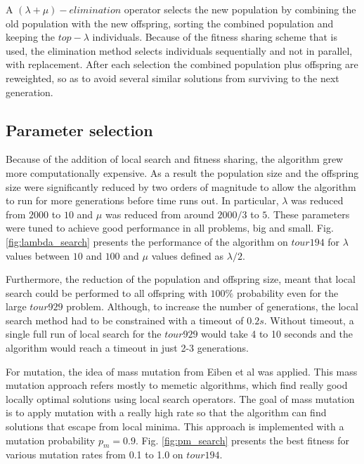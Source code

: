 \documentclass[a4paper,10pt]{article}
\newcommand{\ReplaceMe}[1]{{\color{blue}#1}}
\begin{document}
A $(\lambda+\mu)-elimination$ operator selects the new population by combining the old population with the new offspring, sorting the combined population and keeping the $top-\lambda$ individuals. Because of the fitness sharing scheme that is used, the elimination method selects individuals sequentially and not in parallel, with replacement. After each selection the combined population plus offspring are reweighted, so as to avoid several similar solutions from surviving to the next generation.

\subsection{Parameter selection}\label{ss:parameter_selection}


Because of the addition of local search and fitness sharing, the algorithm grew more computationally expensive. As a result the population size and the offspring size were significantly reduced by two orders of magnitude to allow the algorithm to run for more generations before time runs out. In particular, $\lambda$ was reduced from $2000$ to $10$ and $\mu$ was reduced from around $2000/3$ to $5$. These parameters were tuned to achieve good performance in all problems, big and small. Fig. \ref{fig:lambda_search} presents the performance of the algorithm on $tour194$ for $\lambda$ values between $10$ and $100$ and $\mu$ values defined as $\lambda/2$.

Furthermore, the reduction of the population and offspring size, meant that local search could be performed to all offspring with $100\%$ probability even for the large $tour929$ problem. Although, to increase the number of generations, the local search method had to be constrained with a timeout of $0.2s$. Without timeout, a single full run of local search for the $tour929$ would take 4 to 10 seconds and the algorithm would reach a timeout in just 2-3 generations.

For mutation, the idea of mass mutation from Eiben et al \cite{eiben} was applied. This mass mutation approach refers mostly to memetic algorithms, which find really good locally optimal solutions using local search operators. The goal of mass mutation is to apply mutation with a really high rate so that the algorithm can find solutions that escape from local minima. This approach is implemented with a mutation probability $p_m = 0.9$. Fig. \ref{fig:pm_search} presents the best fitness for various mutation rates from 0.1 to 1.0 on $tour194$.
\end{document}
